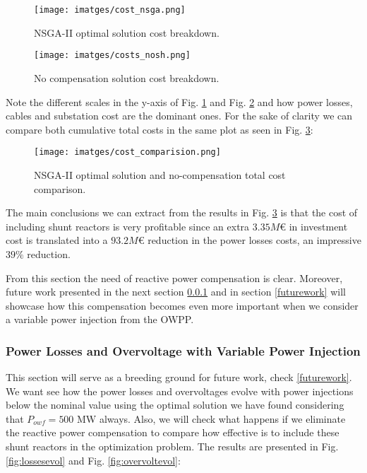 \documentclass[a4paper,11pt, titlepage, twoside]{article}
\begin{document}
\begin{figure}[H]
    \centering
    \texttt{[image: imatges/cost\_nsga.png]}
    \caption{NSGA-II optimal solution cost breakdown.}
    \label{fig:nsgacosts}
\end{figure}

\begin{figure}[H]
    \centering
    \texttt{[image: imatges/costs\_nosh.png]}
    \caption{No compensation solution cost breakdown.}
    \label{fig:noshcosts}
\end{figure}
Note the different scales in the y-axis of Fig. \ref{fig:nsgacosts} and Fig. \ref{fig:noshcosts} and how power losses, cables and substation cost are the dominant ones. For the sake of clarity 
we can compare both cumulative total costs in the same plot as seen in Fig. \ref{fig:coparativecosts}:
\begin{figure}[H]
    \centering
    \texttt{[image: imatges/cost\_comparision.png]}
    \caption{NSGA-II optimal solution and no-compensation total cost comparison.}
    \label{fig:coparativecosts}
\end{figure}

The main conclusions we can extract from the results in Fig. \ref{fig:coparativecosts} is that the cost of including shunt reactors is very profitable since an extra
$ 3.35 M\euro$ in investment cost is translated into a $ 93.2 M\euro$ reduction in the power losses costs, an impressive $ 39 \% $ reduction.

From this section the need of reactive power compensation is clear. Moreover, future work presented in the next section \ref{injectionevol} and in section \ref{futurework} will showcase how this compensation becomes even more important when we consider 
a variable power injection from the OWPP.

\subsubsection{Power Losses and Overvoltage with Variable Power Injection} \label{injectionevol}

This section will serve as a breeding ground for future work, check \ref{futurework}. We want see how the power losses and overvoltages evolve with power injections below the nominal value using the optimal solution we have found considering that $P_{owf} = 500$ MW always. Also, we will check what happens if we eliminate the reactive power compensation to 
compare how effective is to include these shunt reactors in the optimization problem.  The results are presented in
Fig. \ref{fig:lossesevol} and Fig. \ref{fig:overvoltevol}:
\end{document}
